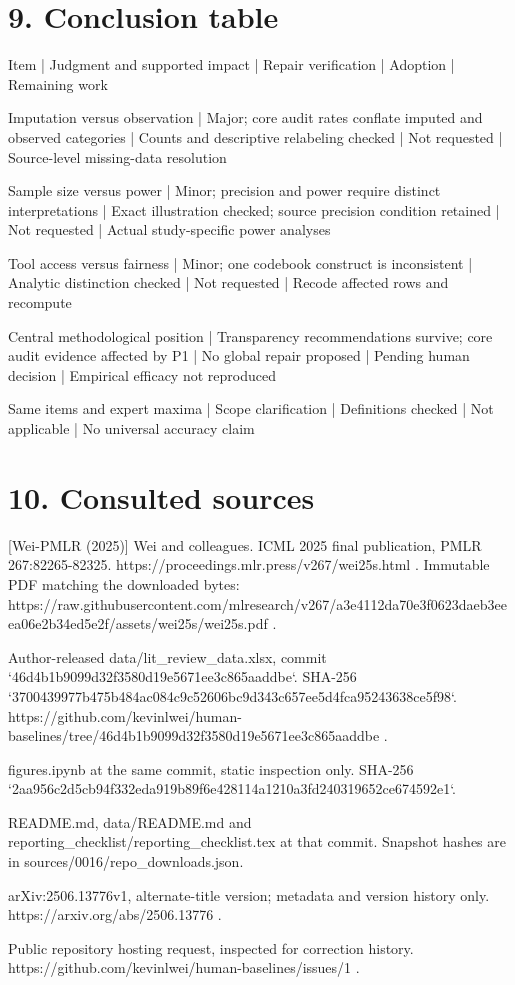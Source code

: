 \documentclass[10pt]{article}
\begin{document}
\section*{9. Conclusion table}
Item | Judgment and supported impact | Repair verification | Adoption | Remaining work\par
Imputation versus observation | Major; core audit rates conflate imputed and observed categories | Counts and descriptive relabeling checked | Not requested | Source-level missing-data resolution\par
Sample size versus power | Minor; precision and power require distinct interpretations | Exact illustration checked; source precision condition retained | Not requested | Actual study-specific power analyses\par
Tool access versus fairness | Minor; one codebook construct is inconsistent | Analytic distinction checked | Not requested | Recode affected rows and recompute\par
Central methodological position | Transparency recommendations survive; core audit evidence affected by P1 | No global repair proposed | Pending human decision | Empirical efficacy not reproduced\par
Same items and expert maxima | Scope clarification | Definitions checked | Not applicable | No universal accuracy claim\par
\section*{10. Consulted sources}
[Wei-PMLR (2025)] Wei and colleagues. ICML 2025 final publication, PMLR 267:82265-82325. https://proceedings.mlr.press/v267/wei25s.html . Immutable PDF matching the downloaded bytes: https://raw.githubusercontent.com/mlresearch/v267/a3e4112da70e3f0623daeb3eeea06e2b34ed5e2f/assets/wei25s/wei25s.pdf .\par
[Wei-data (2025/06)] Author-released data/lit\_review\_data.xlsx, commit `46d4b1b9099d32f3580d19e5671ee3c865aaddbe`. SHA-256 `3700439977b475b484ac084c9c52606bc9d343c657ee5d4fca95243638ce5f98`. https://github.com/kevinlwei/human-baselines/tree/46d4b1b9099d32f3580d19e5671ee3c865aaddbe .\par
[Wei-notebook (2025/06)] figures.ipynb at the same commit, static inspection only. SHA-256 `2aa956c2d5cb94f332eda919b89f6e428114a1210a3fd240319652ce674592e1`.\par
[Wei-repo (2025/06)] README.md, data/README.md and reporting\_checklist/reporting\_checklist.tex at that commit. Snapshot hashes are in sources/0016/repo\_downloads.json.\par
[Wei-arXiv (2025/06)] arXiv:2506.13776v1, alternate-title version; metadata and version history only. https://arxiv.org/abs/2506.13776 .\par
[Issue-1 (2025/06)] Public repository hosting request, inspected for correction history. https://github.com/kevinlwei/human-baselines/issues/1 .\par
\end{document}
